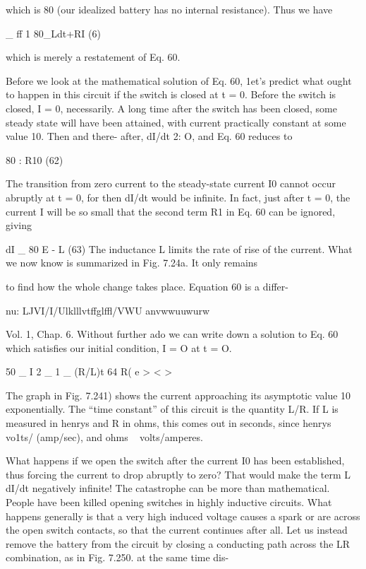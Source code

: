 which is 80 (our idealized battery has no internal resistance). Thus
we have

_ ff 1
80_Ldt+RI (6)

which is merely a restatement of Eq. 60.

Before we look at the mathematical solution of Eq. 60, 1et's predict
what ought to happen in this circuit if the switch is closed at t = 0.
Before the switch is closed, I = 0, necessarily. A long time after the
switch has been closed, some steady state will have been attained,
with current practically constant at some value 10. Then and there-
after, dI/dt 2: O, and Eq. 60 reduces to

80 : R10 (62)

The transition from zero current to the steady-state current I0 cannot
occur abruptly at t = 0, for then dI/dt would be infinite. In fact,
just after t = 0, the current I will be so small that the second term
R1 in Eq. 60 can be ignored, giving

dI _ 80
E - L (63)
The inductance L limits the rate of rise of the current.
What we now know is summarized in Fig. 7.24a. It only remains

to find how the whole change takes place. Equation 60 is a differ-

nu: LJVI/I/Ulklllvtffglffl/VWU anvwwuuwurw

Vol. 1, Chap. 6. Without further ado we can write down a solution
to Eq. 60 which satisfies our initial condition, I = O at t = O.

50 _
I 2 _ 1 _ (R/L)t 64
R( e > < >

The graph in Fig. 7.241) shows the current approaching its asymptotic
value 10 exponentially. The ``time constant'' of this circuit is
the quantity L/R. If L is measured in henrys and R in ohms, this
comes out in seconds, since henrys ~ vo1ts/ (amp/sec), and
ohms ~ volts/amperes.

What happens if we open the switch after the current I0 has been
established, thus forcing the current to drop abruptly to zero? That
would make the term L dI/dt negatively infinite! The catastrophe
can be more than mathematical. People have been killed opening
switches in highly inductive circuits. What happens generally is that
a very high induced voltage causes a spark or are across the open
switch contacts, so that the current continues after all. Let us instead
remove the battery from the circuit by closing a conducting
path across the LR combination, as in Fig. 7.250. at the same time dis-


